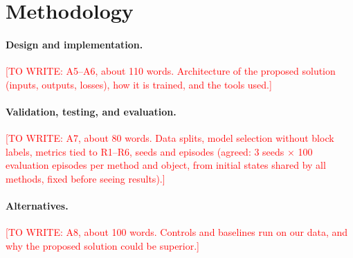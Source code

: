 \documentclass{article}
\newcommand{\todo}[1]{\textcolor{red}{[TO WRITE: #1]}}
\begin{document}
\section*{Methodology}

\paragraph{Design and implementation.}
\todo{A5--A6, about 110 words. Architecture of the proposed solution (inputs,
outputs, losses), how it is trained, and the tools used.}

\paragraph{Validation, testing, and evaluation.}
\todo{A7, about 80 words. Data splits, model selection without block labels,
metrics tied to R1--R6, seeds and episodes (agreed: 3 seeds $\times$ 100
evaluation episodes per method and object, from initial states shared by all
methods, fixed before seeing results).}

\paragraph{Alternatives.}
\todo{A8, about 100 words. Controls and baselines run on our data, and why the
proposed solution could be superior.}
\end{document}
